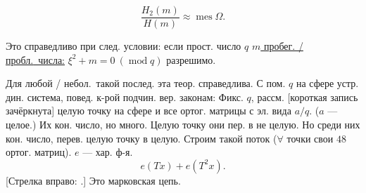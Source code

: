 \par\noindent\begin{minipage}{\linewidth}
\begin{equation*}
\frac{H_2(m)}{H(m)}\approx\operatorname{mes}\Omega.
\end{equation*}
\end{minipage}\par
\par\noindent\begin{minipage}{\linewidth}
Это справедливо при след. условии:
если прост. число $q$
\underline{$m$ \textcolor{orange!65!black}{пробег. / пробл.}\ числа:} $\xi^2+m=0\ (\operatorname{mod}q)$ разрешимо.
\end{minipage}\par
Для \textcolor{orange!65!black}{любой / небол.}\ такой послед. эта теор. справедлива.
С пом. $q$ на сфере устр. дин. система,
повед. к-рой подчин. вер. законам:
Фикс. $q$, рассм. [короткая запись зачёркнута] целую точку на сфере и все ортог. матрицы с эл. вида $a/q$.
($a$ --- целое.) Их кон. число, но много.
Целую точку они пер. в не целую.
Но среди них кон. число, перев. целую точку в целую.
Строим такой поток
($\forall$ точки свои $48$ ортог. матриц).
$e$ --- хар. ф-я.
\begin{equation*}
e(Tx)+e(T^2x).
\end{equation*}
[Стрелка вправо: .]
Это марковская цепь.


